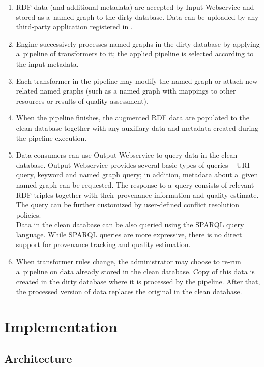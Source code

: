 \begin{enumerate}
  \item RDF data (and additional metadata) are accepted by Input Webservice and stored as a~named graph to the {dirty database}. Data can be uploaded by any third-party application registered in \odcs.
  \item Engine successively processes named graphs in the dirty database by applying a~pipeline of transformers to it; the applied pipeline is selected according to the input metadata.
  \item Each transformer in the pipeline may modify the named graph or attach new related named graphs (such as a named graph with mappings to other resources or results of quality assessment).
  \item When the pipeline finishes, the augmented RDF data are populated to the {clean database} together with any auxiliary data and metadata created during the pipeline execution.
  \item Data consumers can use Output Webservice to query data in the clean database. Output Webservice provides several basic types of queries -- URI query, keyword and named graph query; in addition, metadata about a~given named graph can be requested. The response to a~query consists of relevant RDF triples together with their provenance information and quality estimate. The query can be further customized by user-defined conflict resolution policies.\\
	Data in the clean database can be also queried using the SPARQL query language. While SPARQL queries are more expressive, there is no direct support for provenance tracking and quality estimation. 
  \item When transformer rules change, the administrator may choose to re-run a~pipeline on data already stored in the clean database. Copy of this data is created in the dirty database where it is processed by the pipeline. After that, the processed version of data replaces the original in the clean database.
\end{enumerate}

\chapter{Implementation}
\section{Architecture}

